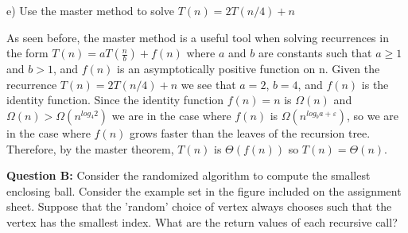 \documentclass[12pt]{article}
\begin{document}
e) Use the master method to solve $T(n) = 2T(n/4) + n$ \smallskip

As seen before, the master method is a useful tool when solving recurrences in the form $T(n) = aT(\frac{n}{b}) + f(n)$ where $a$ and $b$ are constants such that $a \geq 1$ and $b > 1$, and $f(n)$ is an asymptotically positive function on n. Given the recurrence $T(n) = 2T(n/4) + n$ we see that $a = 2$, $b = 4$, and $f(n)$ is the identity function. Since the identity function $f(n) = n$ is $\Omega (n)$ and $\Omega (n) > \Omega (n^{log_4 2})$ we are in the case where $f(n)$ is $\Omega (n^{log_b a + \varepsilon})$, so we are in the case where $f(n)$ grows faster than the leaves of the recursion tree. Therefore, by the master theorem, $T(n)$ is $\Theta (f(n))$ so $T(n) = \Theta (n)$. \bigskip

\noindent
\textbf{Question B:} Consider the randomized algorithm to compute the smallest enclosing ball. Consider the example set in the figure included on the assignment sheet. Suppose that the 'random' choice of vertex always chooses such that the vertex has the smallest index. What are the return values of each recursive call? \smallskip
\end{document}
